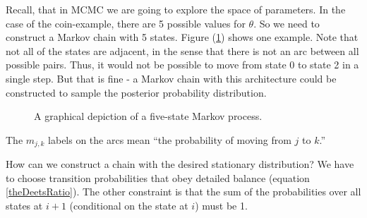 \documentclass[11pt]{article}
\begin{document}
Recall, that in MCMC we are going to explore the space of parameters.  
In the case of the coin-example, there are 5 possible values for $\theta$.
So we need to construct a Markov chain with 5 states.
Figure (\ref{fig5state}) shows one example.
Note that not all of the states are adjacent, in the sense that there is not an arc between all possible pairs. 
Thus, it would not be possible to move from state 0 to state 2 in a single step.
But that is fine - a Markov chain with this architecture could be constructed to sample the posterior probability distribution.
\begin{figure}[h]
\caption{A graphical depiction of a five-state Markov process.}\label{fig5state}
\end{figure}
The $m_{j,k}$ labels on the arcs mean ``the probability of moving from $j$ to $k$.''

How can we construct a chain with the desired stationary distribution?  We have to choose transition probabilities that obey detailed balance (equation \ref{theDeetsRatio}). The other constraint is that the sum of the probabilities over all states at $i+1$ (conditional on the state at $i$) must be 1.
\end{document}
